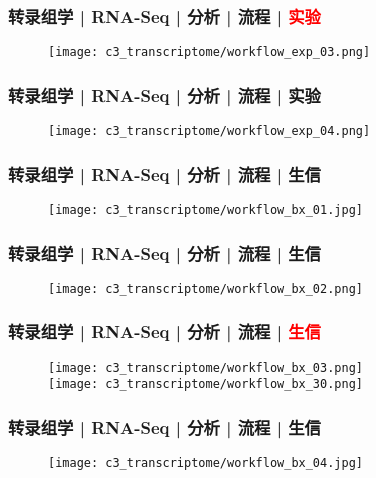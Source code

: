 \begin{frame}
  \frametitle{转录组学 | RNA-Seq | 分析 | 流程 | \textcolor{red}{实验}}
  \begin{figure}
    \centering
    \texttt{[image: c3\_transcriptome/workflow\_exp\_03.png]}
  \end{figure}
\end{frame}

\begin{frame}
  \frametitle{转录组学 | RNA-Seq | 分析 | 流程 | 实验}
  \begin{figure}
    \centering
    \texttt{[image: c3\_transcriptome/workflow\_exp\_04.png]}
  \end{figure}
\end{frame}

\begin{frame}
  \frametitle{转录组学 | RNA-Seq | 分析 | 流程 | 生信}
  \begin{figure}
    \centering
    \texttt{[image: c3\_transcriptome/workflow\_bx\_01.jpg]}
  \end{figure}
\end{frame}

\begin{frame}
  \frametitle{转录组学 | RNA-Seq | 分析 | 流程 | 生信}
  \begin{figure}
    \centering
    \texttt{[image: c3\_transcriptome/workflow\_bx\_02.png]}
  \end{figure}
\end{frame}

\begin{frame}
  \frametitle{转录组学 | RNA-Seq | 分析 | 流程 | \textcolor{red}{生信}}
  \begin{figure}
    \centering
    \texttt{[image: c3\_transcriptome/workflow\_bx\_03.png]}\\
    \vspace{1em}
    \texttt{[image: c3\_transcriptome/workflow\_bx\_30.png]}
  \end{figure}
\end{frame}

\begin{frame}
  \frametitle{转录组学 | RNA-Seq | 分析 | 流程 | 生信}
  \begin{figure}
    \centering
    \texttt{[image: c3\_transcriptome/workflow\_bx\_04.jpg]}
  \end{figure}
\end{frame}

